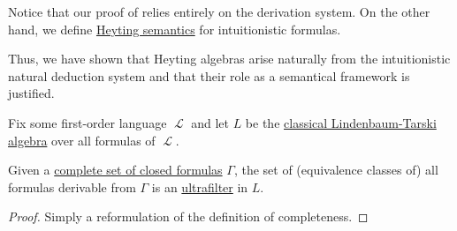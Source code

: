 \begin{remark}\label{rem:thm:intuitionistic_lindenbaum_tarski_algebra/syntactic_proof}
  Notice that our proof of  relies entirely on the derivation system. On the other hand, we define \hyperref[def:propositional_heyting_algebra_semantics]{Heyting semantics} for intuitionistic formulas.

  Thus, we have shown that Heyting algebras arise naturally from the intuitionistic natural deduction system and that their role as a semantical framework is justified.
\end{remark}

\begin{proposition}\label{thm:filters_intuitionistic_lindenbaum_tarski_algebra}
  Fix some first-order language \( \mscrL \) and let \( L \) be the \hyperref[thm:filters_intuitionistic_lindenbaum_tarski_algebra]{classical Lindenbaum-Tarski algebra} over all formulas of \( \mscrL \).

  Given a \hyperref[def:first_order_theory/complete]{complete set of closed formulas} \( \Gamma \), the set of (equivalence classes of) all formulas derivable from \( \Gamma \) is an \hyperref[def:ultrafilter]{ultrafilter} in \( L \).
\end{proposition}
\begin{proof}
  Simply a reformulation of the definition of completeness.
\end{proof}
